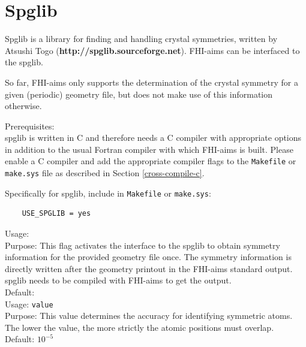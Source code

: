 \section{Spglib}

Spglib is a library for finding and handling crystal
symmetries, written by Atsushi Togo
(\textbf{http://spglib.sourceforge.net}). FHI-aims can be interfaced
to the spglib.  

So far, FHI-aims only supports the determination
of the crystal symmetry for a given 
(periodic) geometry file, but does not make use of this information
otherwise. 

Prerequisites: \\

spglib is written in C and therefore needs a C compiler with
appropriate options in addition to the usual Fortran compiler with
which FHI-aims is built. Please enable a C compiler and add the
appropriate compiler flags to the \texttt{Makefile} or
\texttt{make.sys} file as described in Section \ref{cross-compile-c}. 

Specifically for spglib, include in \texttt{Makefile} or \texttt{make.sys}:\\
  
\begin{verbatim}
    USE_SPGLIB = yes
\end{verbatim}



{
  \noindent
  Usage:   \\[1.0ex]  
  Purpose: This flag activates the interface to the spglib to obtain 
  symmetry information for the provided geometry file once.
  The symmetry information is directly written after the geometry printout
  in the FHI-aims standard output. spglib needs to be compiled with FHI-aims 
  to get the output. \\[1.0ex]
  Default:  \\
}
{
  \noindent
  Usage:  \texttt{value} \\[1.0ex]  
  Purpose: This value determines the accuracy for identifying symmetric atoms. 
  The lower the value, the more strictly the atomic positions must overlap.\\[1.0ex] 
  Default: $10^{-5}$
}
